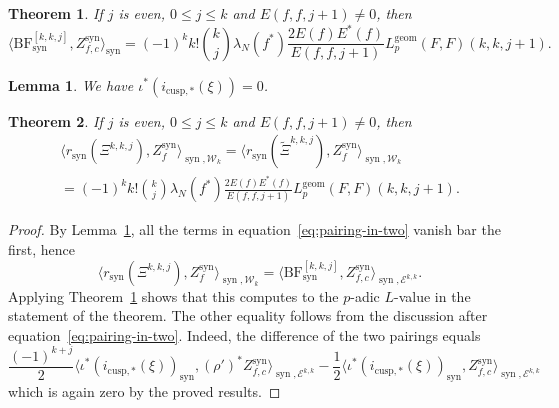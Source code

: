 \documentclass[10pt,a4paper]{amsart}
\newtheorem{theorem}{Theorem}
\newtheorem{lemma}{Lemma}
\newcommand{\BF}{\mathrm{BF}}
\newcommand{\Ell}{\mathcal{E}}
\newcommand{\KS}{\mathscr{W}}
\newcommand{\Lgeom}{L_p^{\mathrm{geom}}}
\newcommand{\cBF}{\Xi}
\newcommand{\lcBF}{\widetilde{\Xi}}
\renewcommand{\le}{\leqslant}
\renewcommand{\leq}{\le}
\newcommand{\regulator}[1]{r_{#1}}
\newcommand{\rsyn}{\regulator{\syn}}
\DeclareMathOperator{\syn}{syn}
\begin{document}
\begin{theorem}
    \label{thm:first-term}
    If $j$ is even, $0\leq j\leq k$ and $E(f,f,j+1)\neq 0$, then
    \[
        \langle \BF^{[k,k,j]}_{\syn},Z_{f,c}^{\syn}\rangle_{\syn} = (-1)^k k!\binom{k}{j}\lambda_N(f^*)\frac{2E(f)E^*(f)}{E(f,f,j+1)}\Lgeom(F,F)(k,k,j+1).
    \]
\end{theorem}

\begin{lemma}
    \label{lemma:cuspidal-is-zero}
    We have $\iota^*(i_{\mathrm{cusp},*}(\xi)) = 0$.
\end{lemma}

\begin{theorem}
    If $j$ is even, $0\leq j\leq k$ and $E(f,f,j+1)\neq 0$, then
\begin{multline*}
    \langle \rsyn(\cBF^{k,k,j}),Z_f^{\syn} \rangle_{\syn, \KS_k} = \langle \rsyn(\lcBF^{k,k,j}),Z_f^{\syn} \rangle_{\syn, \KS_k} \\
 = (-1)^k k!\binom{k}{j}\lambda_N(f^*)\frac{2E(f)E^*(f)}{E(f,f,j+1)}\Lgeom(F,F)(k,k,j+1).
\end{multline*}
\end{theorem}

\begin{proof}
    By Lemma~\ref{lemma:cuspidal-is-zero}, all the terms in equation~\eqref{eq:pairing-in-two} vanish bar the first, hence
    \[
        \langle \rsyn(\cBF^{k,k,j}),Z_f^{\syn} \rangle_{\syn, \KS_k} = \langle \BF^{[k,k,j]}_{\syn}, Z_{f,c}^{\syn} \rangle_{\syn,\Ell^{k, k}}.
    \]
    Applying Theorem~\ref{thm:first-term} shows that this computes to the $p$-adic $L$-value in the statement of the theorem. The other equality follows from the discussion after equation~\eqref{eq:pairing-in-two}. Indeed, the difference of the two pairings equals
    \[
        \frac{(-1)^{k+j}}{2}\langle \iota^*(i_{\mathrm{cusp},*}(\xi))_{\syn}, (\rho')^* Z_{f,c}^{\syn} \rangle_{\syn,\Ell^{k,k}} - \frac{1}{2}\langle \iota^*(i_{\mathrm{cusp},*}(\xi))_{\syn}, Z_{f,c}^{\syn} \rangle_{\syn,\Ell^{k,k}}
    \]
    which is again zero by the proved results.
\end{proof}
\end{document}
